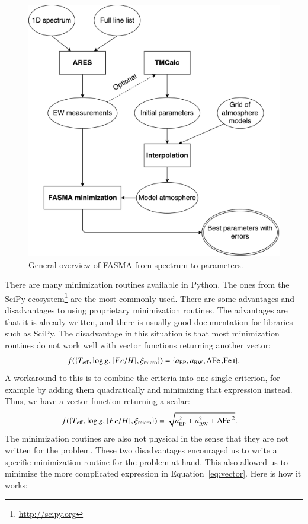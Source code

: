 \documentclass{aa}
\begin{document}
\begin{figure}[tpb]
    \centering
    \includegraphics[width=1.0\linewidth,natwidth=700,natheight=650]{figures/FASMA_general.pdf}
    \caption{General overview of FASMA from spectrum to parameters.}
    \label{fig:FASMA_general}
\end{figure}

There are many minimization routines available in Python. The ones from the
SciPy ecosystem\footnote{\url{http://scipy.org}} are the most commonly used.
There are some advantages and disadvantages to using proprietary minimization
routines. The advantages are that it is already written, and there is usually
good documentation for libraries such as SciPy. The disadvantage in this
situation is that most minimization routines do not work well with vector
functions returning another vector:
\begin{align}
    f(\{T_\mathrm{eff}, \log g, [Fe/H], \xi_\mathrm{micro}\}) = \{a_\mathrm{EP}, a_\mathrm{RW}, \Delta\ion{Fe}, \ion{Fe}{I}\}. \label{eq:vector}
\end{align}
A workaround to this is to combine the criteria into one single criterion, for
example by adding them quadratically and minimizing that expression instead.
Thus, we have a vector function returning a scalar:
\begin{align}
    f(\{T_\mathrm{eff}, \log g, [Fe/H], \xi_\mathrm{micro}\}) &= \sqrt{a_\mathrm{EP}^2 + a_\mathrm{RW}^2 + \Delta\ion{Fe}{}^2}. \label{eq:scalar}
\end{align}
The minimization routines are also not physical in the sense that they are not
written for the problem. These two disadvantages encouraged us to write a
specific minimization routine for the problem at hand. This also allowed us to
minimize the more complicated expression in Equation~\ref{eq:vector}. Here is
how it works:
\end{document}

